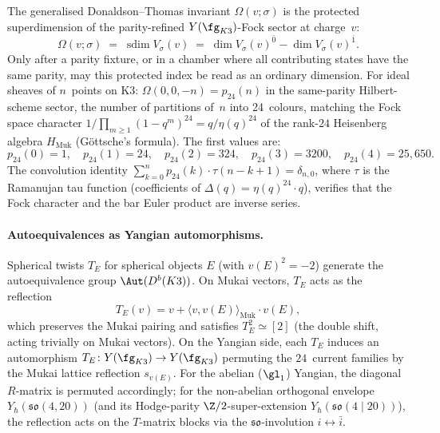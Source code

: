 \begin{conjecture}
\label{conj:dt-fock-dimension}
\ClaimStatusConjectured
The generalised Donaldson--Thomas invariant $\Omega(v; \sigma)$ is the
protected superdimension of the parity-refined $Y(\fg_{K3})$-Fock
sector at charge~$v$:
\[
 \Omega(v; \sigma)
 \;=\;
 \operatorname{sdim} V_\sigma(v)
 \;=\;
 \dim V_\sigma(v)^{\bar 0}-\dim V_\sigma(v)^{\bar 1}.
\]
Only after a parity fixture, or in a chamber where all contributing
states have the same parity, may this protected index be read as an
ordinary dimension. For ideal sheaves of $n$~points on K3:
$\Omega(0, 0, -n) = p_{24}(n)$ in the same-parity Hilbert-scheme
sector, the number of partitions of~$n$ into 24~colours, matching the
Fock space character $1/\prod_{m \geq 1}(1-q^m)^{24} = q/\eta(q)^{24}$
of the rank-$24$ Heisenberg algebra $H_{\mathrm{Muk}}$ (G\"ottsche's
formula). The first values are:
\[
 p_{24}(0) = 1, \quad p_{24}(1) = 24, \quad p_{24}(2) = 324, \quad p_{24}(3) = 3200, \quad p_{24}(4) = 25{,}650.
\]
The convolution identity $\sum_{k=0}^{n} p_{24}(k) \cdot \tau(n-k+1) = \delta_{n,0}$, where $\tau$ is the Ramanujan tau function (coefficients of $\Delta(q) = \eta(q)^{24} \cdot q$), verifies that the Fock character and the bar Euler product are inverse series.
\end{conjecture}

\paragraph{Autoequivalences as Yangian automorphisms.}
Spherical twists $T_E$ for spherical objects $E$ (with $v(E)^2 = -2$) generate the autoequivalence group $\Aut(D^b(K3))$. On Mukai vectors, $T_E$ acts as the reflection
\begin{equation}\label{eq:spherical-twist-reflection}
 T_E(v) = v + \langle v, v(E) \rangle_{\mathrm{Muk}} \cdot v(E),
\end{equation}
which preserves the Mukai pairing and satisfies $T_E^2 \simeq [2]$ (the double shift, acting trivially on Mukai vectors). On the Yangian side, each $T_E$ induces an automorphism $T_E \colon Y(\fg_{K3}) \to Y(\fg_{K3})$ permuting the $24$~current families by the Mukai lattice reflection $s_{v(E)}$. For the abelian ($\gl_1$) Yangian, the diagonal $R$-matrix is permuted accordingly; for the non-abelian orthogonal envelope $Y_\hbar(\mathfrak{so}(4, 20))$ (and its Hodge-parity $\Z/2$-super-extension $Y_\hbar(\mathfrak{so}(4 \mid 20))$), the reflection acts on the $T$-matrix blocks via the $\mathfrak{so}$-involution $i \leftrightarrow \bar i$.

